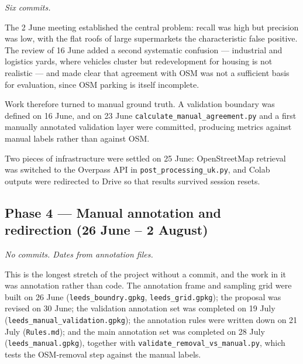 \emph{Six commits.}

The 2 June meeting established the central problem: recall was high but precision was low, with the flat roofs of large supermarkets the characteristic false positive. The review of 16 June added a second systematic confusion --- industrial and logistics yards, where vehicles cluster but redevelopment for housing is not realistic --- and made clear that agreement with OSM was not a sufficient basis for evaluation, since OSM parking is itself incomplete.

Work therefore turned to manual ground truth. A validation boundary was defined on 16 June, and on 23 June \texttt{calculate\_\allowbreak{}manual\_\allowbreak{}agreement.\allowbreak{}py} and a first manually annotated validation layer were committed, producing metrics against manual labels rather than against OSM.

Two pieces of infrastructure were settled on 25 June: OpenStreetMap retrieval was switched to the Overpass API in \texttt{post\_\allowbreak{}processing\_\allowbreak{}uk.\allowbreak{}py}, and Colab outputs were redirected to Drive so that results survived session resets.

\hypertarget{phase-4-manual-annotation-and-redirection-26-june-2-august}{%
\subsection*{Phase 4 --- Manual annotation and\\redirection (26 June -- 2 August)}\label{phase-4-manual-annotation-and-redirection-26-june-2-august}}

\emph{No commits. Dates from annotation files.}

This is the longest stretch of the project without a commit, and the work in it was annotation rather than code. The annotation frame and sampling grid were built on 26 June (\texttt{leeds\_\allowbreak{}boundry.\allowbreak{}gpkg}, \texttt{leeds\_\allowbreak{}grid.\allowbreak{}gpkg}); the proposal was revised on 30 June; the validation annotation set was completed on 19 July (\texttt{leeds\_\allowbreak{}manual\_\allowbreak{}validation.\allowbreak{}gpkg}); the annotation rules were written down on 21 July (\texttt{Rules.md}); and the main annotation set was completed on 28 July (\texttt{leeds\_\allowbreak{}manual.\allowbreak{}gpkg}), together with \texttt{validate\_\allowbreak{}removal\_\allowbreak{}vs\_\allowbreak{}manual.\allowbreak{}py}, which tests the OSM-removal step against the manual labels.

